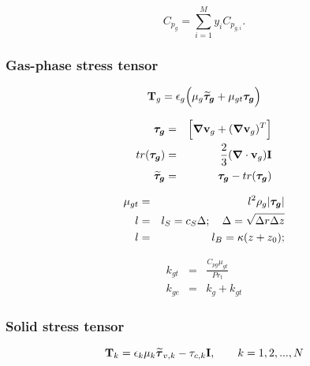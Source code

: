 \begin{equation}
C_{p_{g}}=\sum_{i=1}^{M}y _{i} C_{p_{g,i}}.
\label{eq:gas_cp}
\end{equation}
 
\subsubsection{\hspace{1cm}Gas-phase stress tensor}

\begin{equation} 
{\bf T}_{g}= \epsilon_{g}\Big( \mu_{g} \mbox{\boldmath $\widetilde{\tau}_{g}$} +
             \mu_{gt}\mbox{\boldmath ${\tau}_{g}$} \Big)
\label{eq:gas_stress}
\end{equation}

\begin{eqnarray}
\mbox{\boldmath ${\tau}_{g}$} & = & \Big[\mbox{\boldmath $\nabla$}
{\bf v}_{g}+ (\mbox{\boldmath $\nabla$}{\bf v}_{g})^{T}\Big] \\
tr(\mbox{\boldmath ${\tau}_{g}$}) & = & \frac{2}{3}(\mbox{\boldmath $\nabla$}\cdot{\bf v}_{g}){\bf I} \\
\mbox{\boldmath $\widetilde {\tau}_{g}$} & = & \mbox{\boldmath ${\tau}_{g}$} - tr(\mbox{\boldmath ${\tau}_{g}$}) 
\label{eq:strain}
\end{eqnarray}

\begin{eqnarray} 
\mu_{gt} & = & l^2 \rho_g |\mbox{\boldmath ${\tau}_{g}$}| \\ 
\label{eq:gas_mu}
l & = & l_S = c_S \Delta ; \quad \Delta = \sqrt{\Delta r \Delta z}\\
l & = & l_B = \kappa (z + z_0); 
\label{scale}
\end{eqnarray}

\begin{eqnarray}
k_{gt} & = & \frac{C_{pg}\mu_{gt}}{Pr_t} \\
k_{ge} & = & k_{g} + k_{gt}
\label{eq:prandtl}
\end{eqnarray}

\subsubsection{\hspace{1cm}Solid stress tensor}

\begin{equation}
{\bf T}_{k} = \epsilon_{k} \mu_{k} \mbox{\boldmath $\widetilde\tau$}_{v,k} - 
              \tau_{c,k} {\bf I},
\hbox{\qquad $k=1,2,...,N$}
\label{eq:solid_stress}
\end{equation}

